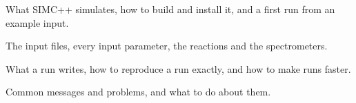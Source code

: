 \documentclass{simcpp}
\begin{document}
\simcfrontmatter



\simcmainmatter

  {What SIMC++ simulates, how to build and install it, and a first run from an example input.}




  {The input files, every input parameter, the reactions and the spectrometers.}




  {What a run writes, how to reproduce a run exactly, and how to make runs faster.}




  {Common messages and problems, and what to do about them.}


\simcappendix

\simcbackmatter
\end{document}
